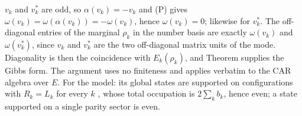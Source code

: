 $v_k$ and $v_k^{*}$ are odd, so $\alpha(v_k) = -v_k$ and (P) gives $\omega(v_k) = \omega(\alpha(v_k)) = -\omega(v_k)$, hence $\omega(v_k) = 0$; likewise for $v_k^{*}$. The off-diagonal entries of the marginal $\rho_k$ in the number basis are exactly $\omega(v_k)$ and $\omega(v_k^{*})$, since $v_k$ and $v_k^{*}$ are the two off-diagonal matrix units of the mode. Diagonality is then the coincidence with $E_k(\rho_k)$, and Theorem  supplies the Gibbs form. The argument uses no finiteness and applies verbatim to the CAR algebra over $E$. For the model: its global states are supported on configurations with $R_k = L_k$ for every $k$ \cite[Lem.~12.1]{ButlerT5}, whose total occupation is $2\sum_k b_k$, hence even; a state supported on a single parity sector is even.
